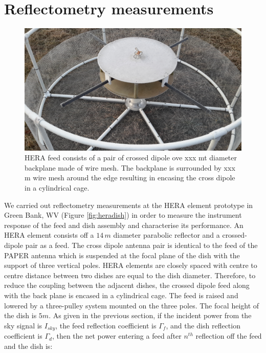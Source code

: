 \documentclass[twocolumn]{emulateapj}
\begin{document}
\section{Reflectometry measurements}
\begin{figure}
\centering
\includegraphics[trim={2cm 10cm 20cm 5cm},clip, totalheight=0.3\textheight]{plots/herafeed.jpg}
\vspace{1.0 em}
\caption{HERA feed consists of a pair of crossed dipole ove xxx mt diameter backplane made of wire mesh. The backplane is surrounded by xxx m wire mesh around the edge resulting in encasing the cross dipole in a cylindrical cage.}
\label{fig:herafeed}
\end{figure}
We carried out reflectometry measurements at the HERA element prototype in Green
Bank, WV (Figure \ref{fig:heradish}) in order to measure the instrument response of the feed and dish assembly and characterise its performance. An HERA element consists off a $14\,m$ diameter
parabolic reflector and a crossed-dipole pair as a feed. The cross dipole antenna pair is identical to the feed of the PAPER antenna which is suspended at the focal plane of the dish with the support of three vertical poles. HERA elements are closely spaced with centre to centre distance between two dishes are equal to the dish diameter. Therefore, to reduce the coupling between the adjacent dishes, the crossed dipole feed along with the back plane is encased in a cylindrical cage. The feed is raised and
lowered by a three-pulley system mounted on the three poles. The focal height of the dish is $5m$.  
As given in the previous section, if the incident power from the sky signal is $I_{sky}$, the feed
reflection coefficient is $\Gamma_{f}$, and the dish reflection
coefficient is $\Gamma_{d}$, then the net power entering a feed after
$n^{th}$ reflection off the feed and the dish is:
\end{document}
